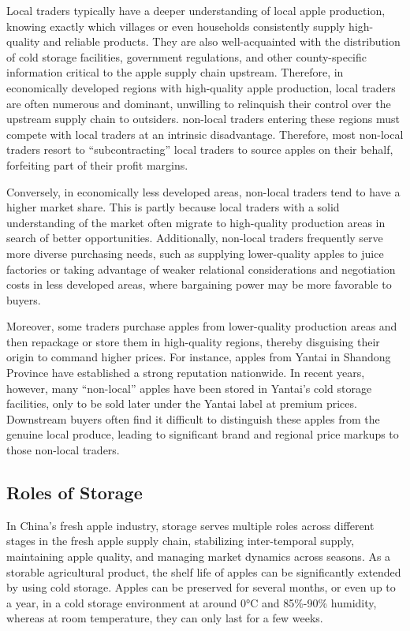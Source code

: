 Local traders typically have a deeper understanding of local apple production, knowing exactly which villages or even households consistently supply high-quality and reliable products. They are also well-acquainted with the distribution of cold storage facilities, government regulations, and other county-specific information critical to the apple supply chain upstream. Therefore, in economically developed regions with high-quality apple production, local traders are often numerous and dominant, unwilling to relinquish their control over the upstream supply chain to outsiders. non-local traders entering these regions must compete with local traders at an intrinsic disadvantage. Therefore, most non-local traders resort to ``subcontracting'' local traders to source apples on their behalf, forfeiting part of their profit margins.  

Conversely, in economically less developed areas, non-local traders tend to have a higher market share. This is partly because local traders with a solid understanding of the market often migrate to high-quality production areas in search of better opportunities. Additionally, non-local traders frequently serve more diverse purchasing needs, such as supplying lower-quality apples to juice factories or taking advantage of weaker relational considerations and negotiation costs in less developed areas, where bargaining power may be more favorable to buyers.  

Moreover, some traders purchase apples from lower-quality production areas and then repackage or store them in high-quality regions, thereby disguising their origin to command higher prices. For instance, apples from Yantai in Shandong Province have established a strong reputation nationwide. In recent years, however, many ``non-local'' apples have been stored in Yantai’s cold storage facilities, only to be sold later under the Yantai label at premium prices. Downstream buyers often find it difficult to distinguish these apples from the genuine local produce, leading to significant brand and regional price markups to those non-local traders.


\subsection{Roles of Storage \label{Section: role of Storage}}
In China's fresh apple industry, storage serves multiple roles across different stages in the fresh apple supply chain, stabilizing inter-temporal supply, maintaining apple quality, and managing market dynamics across seasons. As a storable agricultural product, the shelf life of apples can be significantly extended by using cold storage. Apples can be preserved for several months, or even up to a year, in a cold storage environment at around 0°C and 85\%-90\% humidity, whereas at room temperature, they can only last for a few weeks.

